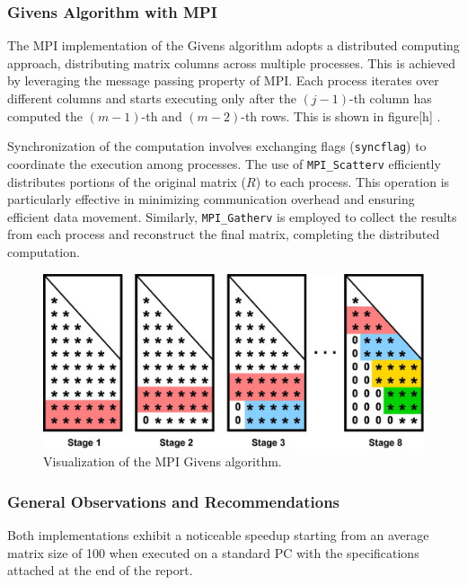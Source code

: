 \documentclass{article}
\begin{document}
\subsubsection{Givens Algorithm with MPI}

The MPI implementation of the Givens algorithm adopts a distributed computing approach, distributing matrix columns across multiple processes. This is achieved by leveraging the message passing property of MPI. Each process iterates over different columns and starts executing only after the \((j-1)\)-th column has computed the \((m-1)\)-th and \((m-2)\)-th rows. This is shown in {figure}[h] .



Synchronization of the computation involves exchanging flags (\texttt{syncflag}) to coordinate the execution among processes. The use of \texttt{MPI\_Scatterv} efficiently distributes portions of the original matrix (\(R\)) to each process. This operation is particularly effective in minimizing communication overhead and ensuring efficient data movement. Similarly, \texttt{MPI\_Gatherv} is employed to collect the results from each process and reconstruct the final matrix, completing the distributed computation.

\begin{figure}[h]
    \centering
    \includegraphics[width=0.8\linewidth]{Applying-Givens-rotations-in-parallel.png}
    \caption{Visualization of the MPI Givens algorithm.}
    \label{fig:mpi_givens}
\end{figure}



\subsubsection{General Observations and Recommendations}

Both implementations exhibit a noticeable speedup starting from an average matrix size of 100 when executed on a standard PC with the specifications attached at the end of the report.
\end{document}
